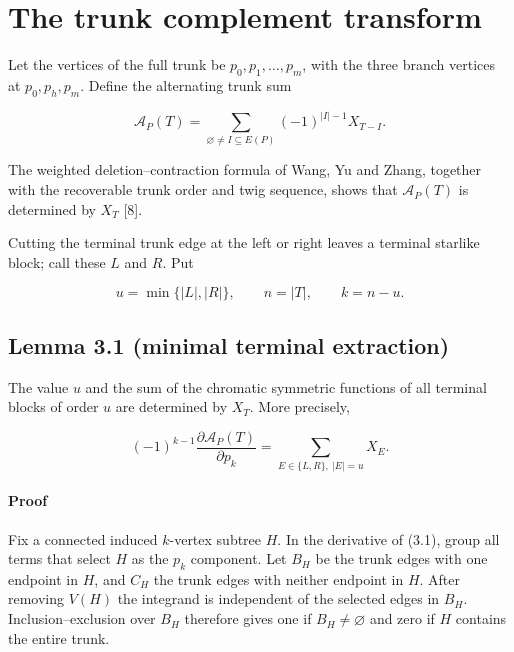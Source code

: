 \documentclass[11pt]{article}
\begin{document}
\section{The trunk complement transform}


Let the vertices of the full trunk be $p_0,p_1,\ldots,p_m$, with the three branch vertices at
$p_0,p_h,p_m$. Define the alternating trunk sum

\begin{equation*}
\mathcal A_P(T)=
\sum_{\varnothing\neq I\subseteq E(P)}(-1)^{|I|-1}X_{T-I}.
\tag{3.1}
\end{equation*}


The weighted deletion--contraction formula of Wang, Yu and Zhang, together with the recoverable
trunk order and twig sequence, shows that $\mathcal A_P(T)$ is determined by $X_T$ [8].

Cutting the terminal trunk edge at the left or right leaves a terminal starlike block; call these
$L$ and $R$. Put

\begin{equation*}
u=\min\{|L|,|R|\},\qquad n=|T|,\qquad k=n-u.
\end{equation*}


\Needspace{0.13\textheight}
\subsection*{Lemma 3.1 (minimal terminal extraction)}


The value $u$ and the sum of the chromatic symmetric functions of all terminal blocks of order $u$
are determined by $X_T$. More precisely,

\begin{equation*}
(-1)^{k-1}\frac{\partial\mathcal A_P(T)}{\partial p_k}
=\sum_{E\in\{L,R\},\ |E|=u}X_E.
\tag{3.2}
\end{equation*}


\paragraph{Proof}


Fix a connected induced $k$-vertex subtree $H$. In the derivative of (3.1), group all terms that
select $H$ as the $p_k$ component. Let $B_H$ be the trunk edges with one endpoint in $H$, and
$C_H$ the trunk edges with neither endpoint in $H$. After removing $V(H)$ the integrand is
independent of the selected edges in $B_H$. Inclusion--exclusion over $B_H$ therefore gives one if
$B_H\neq\varnothing$ and zero if $H$ contains the entire trunk.
\end{document}

